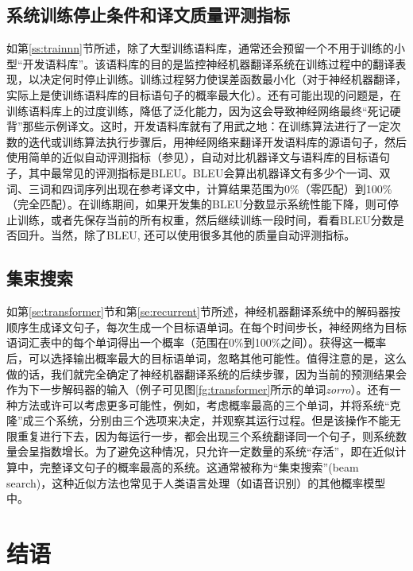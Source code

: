 \documentclass[output=paper,colorlinks,citecolor=brown]{langscibook}
\begin{document}
\subsection{系统训练停止条件和译文质量评测指标}\label{sec:perez:7.2}
\label{ss:stop}
如第\ref{ss:trainnn}节所述，除了大型训练语料库，通常还会预留一个不用于训练的小型“开发语料库”。该语料库的目的是监控神经机器翻译系统在训练过程中的翻译表现，以决定何时停止训练。训练过程努力使误差函数最小化（对于神经机器翻译，实际上是使训练语料库的目标语句子的概率最大化）。还有可能出现的问题是，在训练语料库上的过度训练，降低了泛化能力，因为这会导致神经网络最终“死记硬背”那些示例译文。这时，开发语料库就有了用武之地：在训练算法进行了一定次数的迭代或训练算法执行步骤后，用神经网络来翻译开发语料库的源语句子，然后使用简单的近似自动评测指标（参见），自动对比机器译文与语料库的目标语句子，其中最常见的评测指标是BLEU\citep{papineni2002bleu}。BLEU会算出机器译文有多少个一词、双词、三词和四词序列出现在参考译文中，计算结果范围为0\%（零匹配）到100\%（完全匹配）。在训练期间，如果开发集的BLEU分数显示系统性能下降，则可停止训练，或者先保存当前的所有权重，然后继续训练一段时间，看看BLEU分数是否回升。当然，除了BLEU, 还可以使用很多其他的质量自动评测指标。


\subsection{集束搜索}
\label{se:beam}

如第\ref{se:transformer}节和第\ref{se:recurrent}节所述，神经机器翻译系统中的解码器按顺序生成译文句子，每次生成一个目标语单词。在每个时间步长，神经网络为目标语词汇表中的每个单词得出一个概率（范围在0\%到100\%之间）。获得这一概率后，可以选择输出概率最大的目标语单词，忽略其他可能性。值得注意的是，这么做的话，我们就完全确定了神经机器翻译系统的后续步骤，因为当前的预测结果会作为下一步解码器的输入（例子可见图\ref{fg:transformer}所示的单词\emph{zorro}）。还有一种方法或许可以考虑更多可能性，例如，考虑概率最高的三个单词，并将系统“克隆”成三个系统，分别由三个选项来决定，并观察其运行过程。但是该操作不能无限重复进行下去，因为每运行一步，都会出现三个系统翻译同一个句子，则系统数量会呈指数增长。为了避免这种情况，只允许一定数量的系统“存活”，即在近似计算中，完整译文句子的概率最高的系统。这通常被称为“集束搜索”(beam search)，这种近似方法也常见于人类语言处理（如语音识别）的其他概率模型中。


\section{结语}
\end{document}
